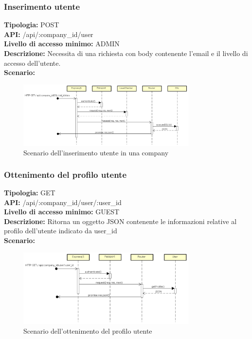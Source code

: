 \newpage
\subsubsection{Inserimento utente}
\textbf{Tipologia:} POST \\
\textbf{API:} /api/:company\_id/user \\
\textbf{Livello di accesso minimo:} ADMIN \\
\textbf{Descrizione:} Necessita di una richiesta con body contenente l'email e il livello di accesso dell'utente.\\
\textbf{Scenario:} 
\begin{figure}[h]
\centering
\includegraphics[width=0.8\textwidth]{res/sections/backend/(POST)user.png}
\caption{Scenario dell'inserimento utente in una company}
\end{figure}

\newpage
\subsubsection{Ottenimento del profilo utente}
\textbf{Tipologia:} GET \\
\textbf{API:} /api/:company\_id/user/:user\_id \\
\textbf{Livello di accesso minimo:} GUEST \\
\textbf{Descrizione:} Ritorna un oggetto JSON contenente le informazioni relative al profilo dell'utente indicato da user\_id \\
\textbf{Scenario:} 
\begin{figure}[h]
\centering
\includegraphics[width=0.8\textwidth]{res/sections/backend/(GET)profiloUtente.png}
\caption{Scenario dell'ottenimento del profilo utente}
\end{figure}


